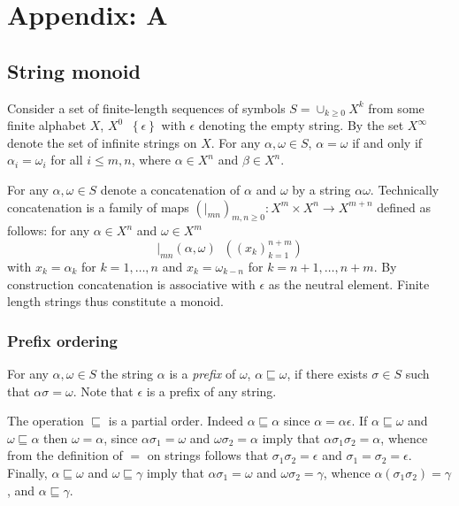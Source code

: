 \documentclass[a4paper]{article}
\newcommand{\obj}[1]{{\left\{ #1 \right \}}}
\newcommand{\brac}[1]{{\left ( #1 \right )}}
\newcommand{\defn}{\mathop{\overset{\Delta}{=}}\nolimits}
\begin{document}


\section{Appendix: A} %
\label{sec:appendix_a}

\subsection{String monoid} %
\label{sub:string_monoid}

Consider a set of finite-length sequences of symbols $S=\cup_{k\geq0} X^k$ from some finite alphabet $X$, $X^0 \defn \obj{ \epsilon }$ with $\epsilon$ denoting the empty string. By the set $X^\infty$ denote the set of infinite strings on $X$. For any $\alpha, \omega\in S$, $\alpha=\omega$ if and only if $\alpha_i = \omega_i$ for all $i\leq m, n$, where $\alpha\in X^n$ and $\beta\in X^n$.

For any $\alpha,\omega\in S$ denote a concatenation of $\alpha$ and $\omega$ by a string $\alpha\omega$. Technically concatenation is a family of maps $\brac{\vert_{mn}}_{m,n\geq 0}:X^m\times X^n\to X^{m+n}$ defined as follows: for any $\alpha\in X^n$ and $\omega\in X^m$ \[\vert_{mn}(\alpha,\omega) \defn \brac{ \brac{x_k}_{k=1}^{n+m} }\] with $x_k=\alpha_k$ for $k=1,\ldots,n$ and $x_k = \omega_{k-n}$ for $k={n+1},\ldots,{n+m}$. By construction concatenation is associative with $\epsilon$ as the neutral element. Finite length strings thus constitute a monoid.

\subsubsection{Prefix ordering} %
\label{ssub:prefix_ordering}

For any $\alpha,\omega \in S$ the string $\alpha$ is a \emph{prefix} of $\omega$, $\alpha\sqsubseteq\omega$, if there exists $\sigma\in S$ such that $\alpha\sigma=\omega$. Note that $\epsilon$ is a prefix of any string.

The operation $\sqsubseteq$ is a partial order. Indeed $\alpha\sqsubseteq\alpha$ since $\alpha = \alpha\epsilon$. If $\alpha\sqsubseteq \omega$ and $\omega \sqsubseteq \alpha$ then $\omega=\alpha$, since $\alpha\sigma_1=\omega$ and $\omega\sigma_2=\alpha$ imply that $\alpha\sigma_1\sigma_2 = \alpha$, whence from the definition of $=$ on strings follows that $\sigma_1\sigma_2=\epsilon$ and $\sigma_1=\sigma_2=\epsilon$. Finally, $\alpha\sqsubseteq\omega$ and $\omega\sqsubseteq\gamma$ imply that $\alpha\sigma_1=\omega$ and $\omega\sigma_2=\gamma$, whence $\alpha(\sigma_1\sigma_2)=\gamma$, and $\alpha\sqsubseteq\gamma$.
\end{document}
